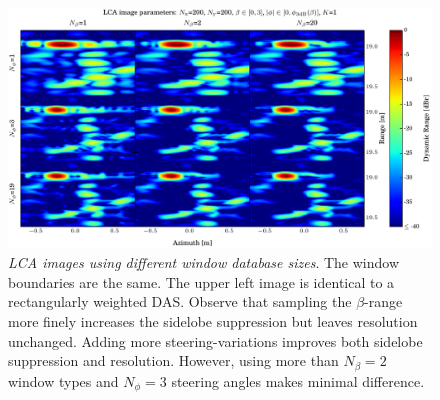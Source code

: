 \documentclass[10pt,journal,draftclsnofoot,onecolumn]{IEEEtran}
\let\MYoriglatexcaption\caption               %
\renewcommand{\caption}[2][\relax]{\MYoriglatexcaption[#2]{#2}}
\newcommand\1{\vec 1}
\begin{document}
\begin{figure}[t]%
\includegraphics[width=\textwidth]{gfx/oversampling_mosaic.pdf}%
\caption{\emph{LCA images using different window database sizes}. The window boundaries are the same. The upper left image is identical to a rectangularly weighted DAS. Observe that sampling the $\beta$-range more finely increases the sidelobe suppression but leaves resolution unchanged. Adding more steering-variations improves both sidelobe suppression and resolution. However, using more than  $N_\beta=2$ window types and $N_\phi=3$ steering angles makes minimal difference.}\label{oversampling_mosaic}
\end{figure}
\end{document}
